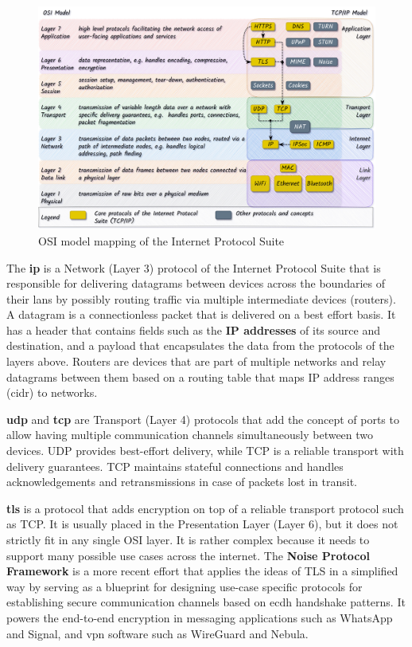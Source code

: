 \begin{figure}
\centering
\includegraphics[width=\textwidth,height=0.5\textheight]{thesis/../figures/osi-map-tcp.drawio.png}
\caption{OSI model mapping of the Internet Protocol
Suite\label{osi-map-tcp}}
\end{figure}

The \textbf{\acrfull{ip}} is a Network (Layer 3) protocol of the
Internet Protocol Suite that is responsible for delivering datagrams
between devices across the boundaries of their \glspl{lan} by possibly
routing traffic via multiple intermediate devices (routers). A datagram
is a connectionless packet that is delivered on a best effort basis. It
has a header that contains fields such as the \textbf{IP addresses} of
its source and destination, and a payload that encapsulates the data
from the protocols of the layers above. Routers are devices that are
part of multiple networks and relay datagrams between them based on a
routing table that maps IP address ranges (\gls{cidr}) to networks.

\textbf{\acrfull{udp}} and \textbf{\acrfull{tcp}} are Transport (Layer
4) protocols that add the concept of ports to allow having multiple
communication channels simultaneously between two devices. UDP provides
best-effort delivery, while TCP is a reliable transport with delivery
guarantees. TCP maintains stateful connections and handles
acknowledgements and retransmissions in case of packets lost in transit.

\textbf{\acrfull{tls}} is a protocol that adds encryption on top of a
reliable transport protocol such as TCP. It is usually placed in the
Presentation Layer (Layer 6), but it does not strictly fit in any single
OSI layer. It is rather complex because it needs to support many
possible use cases across the internet.  The \textbf{Noise
Protocol Framework} \autocite{noiseDocs} is a more
 recent effort that applies the
ideas of TLS in a simplified way by serving as a blueprint for designing
use-case specific protocols for establishing secure communication
channels based on \gls{ecdh} handshake patterns. It powers the
end-to-end encryption in messaging applications such as WhatsApp and
Signal, and \gls{vpn} software such as WireGuard and Nebula.

